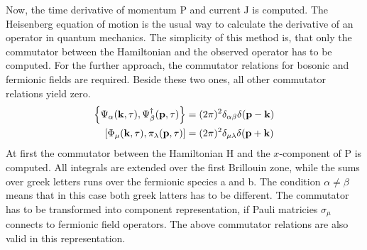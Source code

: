 Now, the time derivative of momentum P and current J is computed.
The Heisenberg equation of motion is the usual way to calculate the derivative of an operator in quantum mechanics.
The simplicity of this method is, that only the commutator between the Hamiltonian and the observed operator has to be computed.
For the further approach, the commutator relations for bosonic and fermionic fields are required.
Beside these two ones, all other commutator relations yield zero.
%
\begin{align}
	\acomm{\Psi_{\mt{\alpha}}(\vb{k},\tau)}{\Psi_{\mt{\beta}}^{\dag}(\vb{p},\tau)} &= (2\pi)^{2} \delta_{\mt{\alpha}\mt{\beta}} \delta(\vb{p}-\vb{k})
	\\
	\comm{\Phi_{\mu}(\vb{k},\tau)}{\pi_{\lambda}(\vb{p},\tau)} &= (2\pi)^{2} \delta_{\mu\lambda} \delta(\vb{p}+\vb{k})
\end{align}
%
At first the commutator between the Hamiltonian H and the $x$-component of P is computed.
All integrals are extended over the first Brillouin zone, while the sums over greek letters runs over the fermionic species a and b.
The condition $\alpha \neq \beta$ means that in this case both greek latters has to be different.
The commutator has to be transformed into component representation, if Pauli matricies $\sigma_{\mu}$ connects to fermionic field operators.
The above commutator relations are also valid in this representation.
%

